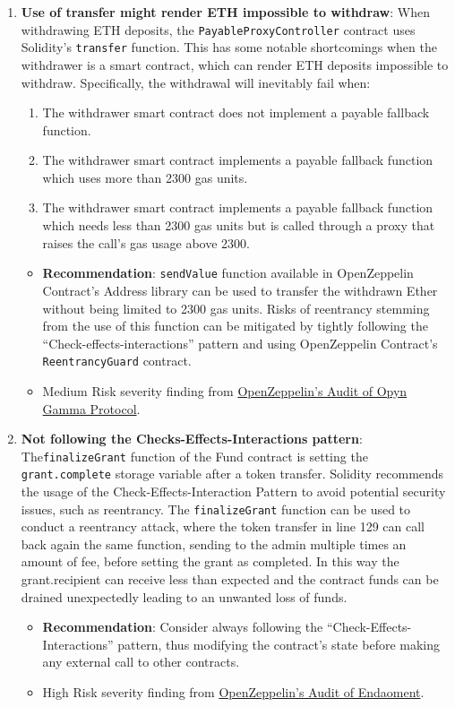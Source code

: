 \begin{enumerate}
\item\textbf{Use of transfer might render ETH impossible to withdraw}: When withdrawing ETH deposits, the \verb|PayableProxyController| contract uses Solidity’s \verb|transfer| function. This has some notable shortcomings when the withdrawer is a smart contract, which can render ETH deposits impossible to withdraw. Specifically, the withdrawal will inevitably fail when:
    \begin{enumerate}
    \item The withdrawer smart contract does not implement a payable fallback function.
    \item The withdrawer smart contract implements a payable fallback function which uses more than 2300 gas units.
    \item The withdrawer smart contract implements a payable fallback function which needs less than 2300 gas units but is called through a proxy that raises the call’s gas usage above 2300.
    \end{enumerate}
	\begin{itemize}
	\item\textbf{Recommendation}: \verb|sendValue| function available in OpenZeppelin Contract’s Address library can be used to transfer the withdrawn Ether without being limited to 2300 gas units. Risks of reentrancy stemming from the use of this function can be mitigated by tightly following the “Check-effects-interactions” pattern and using OpenZeppelin Contract’s \verb|ReentrancyGuard| contract.
	\item Medium Risk severity finding from \href{https://blog.openzeppelin.com/opyn-gamma-protocol-audit/}{OpenZeppelin’s Audit of Opyn Gamma Protocol}.
	\end{itemize}

\item\textbf{Not following the Checks-Effects-Interactions pattern}: The\linebreak\verb|finalizeGrant| function of the Fund contract is setting the \verb|grant.complete| storage variable after a token transfer. Solidity recommends the usage of the Check-Effects-Interaction Pattern to avoid potential security issues, such as reentrancy. The \verb|finalizeGrant| function can be used to conduct a reentrancy attack, where the token transfer in line 129 can call back again the same function, sending to the admin multiple times an amount of fee, before setting the grant as completed. In this way the grant.recipient can receive less than expected and the contract funds can be drained unexpectedly leading to an unwanted loss of funds.
	\begin{itemize}
	\item\textbf{Recommendation}: Consider always following the “Check-Effects-Interactions” pattern, thus modifying the contract’s state before making any external call to other contracts.
	\item High Risk severity finding from \href{https://blog.openzeppelin.com/endaoment-audit/}{OpenZeppelin’s Audit of Endaoment}.
	\end{itemize}


\end{enumerate}
